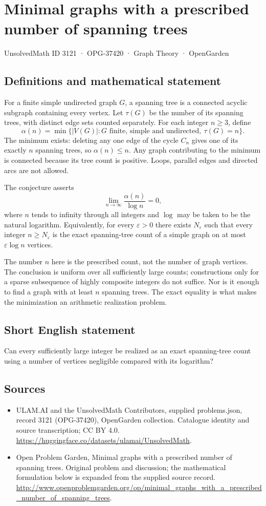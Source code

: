 \documentclass[11pt,a4paper]{article}
\begin{document}
\section*{Minimal graphs with a prescribed number of spanning trees}\label{3121}
{\small UnsolvedMath ID 3121 · OPG-37420 · Graph Theory · OpenGarden}
\subsection{Definitions and mathematical statement}
For a finite simple undirected graph $G$, a spanning tree is a connected
acyclic subgraph containing every vertex. Let $\tau(G)$ be the number
of its spanning trees, with distinct edge sets counted separately.
For each integer $n\ge3$, define
\[
 \alpha(n)=\min\{|V(G)|:G\text{ finite, simple and undirected},\
                                  \tau(G)=n\}.
\]
The minimum exists: deleting any one edge of the cycle $C_n$ gives
one of its exactly $n$ spanning trees, so $\alpha(n)\le n$.
Any graph contributing to the minimum is connected because its tree
count is positive. Loops, parallel edges and directed arcs are not allowed.

The conjecture asserts
\[
 \lim_{n\to\infty}\frac{\alpha(n)}{\log n}=0,
\]
where $n$ tends to infinity through all integers and $\log$ may be taken
to be the natural logarithm. Equivalently, for every $\varepsilon>0$
there exists $N_\varepsilon$ such that every integer $n\ge N_\varepsilon$
is the exact spanning-tree count of a simple graph on at most
$\varepsilon\log n$ vertices.

The number $n$ here is the prescribed count, not the number of graph
vertices. The conclusion is uniform over all sufficiently large counts;
constructions only for a sparse subsequence of highly composite integers
do not suffice. Nor is it enough to find a graph with at least $n$
spanning trees. The exact equality is what makes the minimization an
arithmetic realization problem.
\subsection{Short English statement}
Can every sufficiently large integer be realized as an exact spanning-tree count using a number of vertices negligible compared with its logarithm?
\subsection{Sources}
\begin{itemize}
\item[S1] ULAM.AI and the UnsolvedMath Contributors, supplied problems.json, record 3121 (OPG-37420), OpenGarden collection. Catalogue identity and source transcription; CC BY 4.0.
\url{https://huggingface.co/datasets/ulamai/UnsolvedMath}.
\item[S2] Open Problem Garden, Minimal graphs with a prescribed number of spanning trees. Original problem and discussion; the mathematical formulation below is expanded from the supplied source record.
\url{http://www.openproblemgarden.org/op/minimal_graphs_with_a_prescribed_number_of_spanning_trees}.
\end{itemize}
\end{document}
